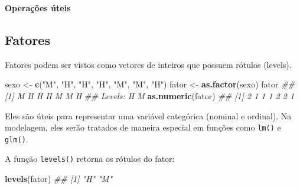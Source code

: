 \documentclass[
]{book}
\newenvironment{Shaded}{\begin{snugshade}}{\end{snugshade}}
\newcommand{\CommentTok}[1]{\textcolor[rgb]{0.56,0.35,0.01}{\textit{#1}}}
\newcommand{\DecValTok}[1]{\textcolor[rgb]{0.00,0.00,0.81}{#1}}
\newcommand{\KeywordTok}[1]{\textcolor[rgb]{0.13,0.29,0.53}{\textbf{#1}}}
\newcommand{\NormalTok}[1]{#1}
\newcommand{\OperatorTok}[1]{\textcolor[rgb]{0.81,0.36,0.00}{\textbf{#1}}}
\newcommand{\StringTok}[1]{\textcolor[rgb]{0.31,0.60,0.02}{#1}}
\begin{document}
\textbf{Operações úteis}

\begin{Shaded}
\end{Shaded}

\hypertarget{fatores}{%
\subsection{Fatores}\label{fatores}}

Fatores podem ser vistos como vetores de inteiros que possuem rótulos (levels).

\begin{Shaded}
\begin{Highlighting}[]
\NormalTok{sexo <-}\StringTok{ }\KeywordTok{c}\NormalTok{(}\StringTok{"M"}\NormalTok{, }\StringTok{"H"}\NormalTok{, }\StringTok{"H"}\NormalTok{, }\StringTok{"H"}\NormalTok{, }\StringTok{"M"}\NormalTok{, }\StringTok{"M"}\NormalTok{, }\StringTok{"H"}\NormalTok{)}
\NormalTok{fator <-}\StringTok{ }\KeywordTok{as.factor}\NormalTok{(sexo)}
\NormalTok{fator}
\CommentTok{## [1] M H H H M M H}
\CommentTok{## Levels: H M}
\KeywordTok{as.numeric}\NormalTok{(fator)}
\CommentTok{## [1] 2 1 1 1 2 2 1}
\end{Highlighting}
\end{Shaded}

Eles são úteis para representar uma variável categórica (nominal e ordinal). Na modelagem, eles serão tratados de maneira especial em funções como \texttt{lm()} e \texttt{glm()}.

A função \texttt{levels()} retorna os rótulos do fator:

\begin{Shaded}
\begin{Highlighting}[]
\KeywordTok{levels}\NormalTok{(fator)}
\CommentTok{## [1] "H" "M"}
\end{Highlighting}
\end{Shaded}
\end{document}
